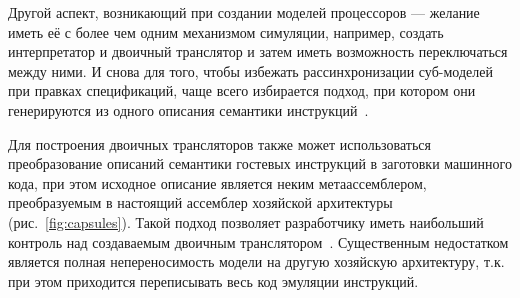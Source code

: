 Другой аспект, возникающий при создании моделей процессоров --- желание иметь её с более чем одним механизмом симуляции, например, создать интерпретатор и двоичный транслятор и затем иметь возможность переключаться между ними. И снова для того, чтобы избежать рассинхронизации суб-моделей при правках спецификаций, чаще всего избирается подход,  при котором они генерируются из одного описания семантики инструкций~\cite{simgen}.

Для построения двоичных трансляторов также может использоваться преобразование описаний семантики гостевых инструкций в заготовки машинного кода, при этом исходное описание является неким метаассемблером, преобразуемым в настоящий ассемблер хозяйской архитектуры (рис.~\ref{fig:capsules}). Такой подход позволяет разработчику иметь наибольший контроль над создаваемым двоичным транслятором~\cite{MyConfMIPT52}. Существенным недостатком является полная непереносимость модели на другую хозяйскую архитектуру, т.к. при этом приходится переписывать весь код эмуляции инструкций.

